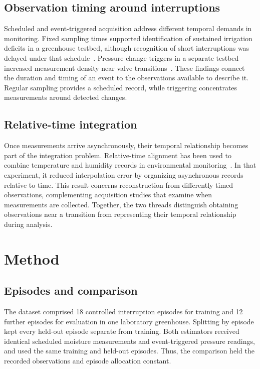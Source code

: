 \subsection{Observation timing around interruptions}
Scheduled and event-triggered acquisition address different temporal demands in monitoring. Fixed sampling times supported identification of sustained irrigation deficits in a greenhouse testbed, although recognition of short interruptions was delayed under that schedule~\cite{routine2022}. Pressure-change triggers in a separate testbed increased measurement density near valve transitions~\cite{event2023}. These findings connect the duration and timing of an event to the observations available to describe it. Regular sampling provides a scheduled record, while triggering concentrates measurements around detected changes.

\subsection{Relative-time integration}
Once measurements arrive asynchronously, their temporal relationship becomes part of the integration problem. Relative-time alignment has been used to combine temperature and humidity records in environmental monitoring~\cite{alignment2024}. In that experiment, it reduced interpolation error by organizing asynchronous records relative to time. This result concerns reconstruction from differently timed observations, complementing acquisition studies that examine when measurements are collected. Together, the two threads distinguish obtaining observations near a transition from representing their temporal relationship during analysis.

\section{Method}
\label{sec:method}
\subsection{Episodes and comparison}
The dataset comprised 18 controlled interruption episodes for training and 12 further episodes for evaluation in one laboratory greenhouse. Splitting by episode kept every held-out episode separate from training. Both estimators received identical scheduled moisture measurements and event-triggered pressure readings, and used the same training and held-out episodes. Thus, the comparison held the recorded observations and episode allocation constant.


